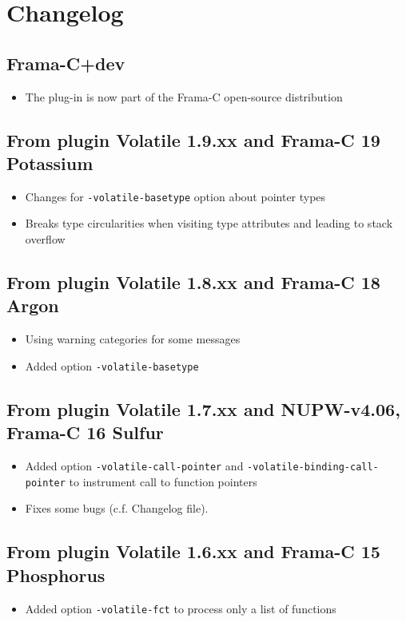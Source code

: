 \chapter*{Changelog}

\section*{Frama-C+dev}
\begin{itemize}
\item The plug-in is now part of the Frama-C open-source distribution
\end{itemize}

\section*{From plugin Volatile 1.9.xx and Frama-C 19 Potassium}
\begin{itemize}
\item Changes for \texttt{-volatile-basetype} option about pointer types
\item Breaks type circularities when visiting type attributes and leading to stack overflow
\end{itemize}

\section*{From plugin Volatile 1.8.xx and Frama-C 18 Argon }
\begin{itemize}
\item Using warning categories for some messages
\item Added option \texttt{-volatile-basetype}
\end{itemize}

\section*{From plugin Volatile 1.7.xx and NUPW-v4.06, Frama-C 16 Sulfur }
\begin{itemize}
\item Added option \texttt{-volatile-call-pointer} and \texttt{-volatile-binding-call-pointer} to instrument call to function pointers
\item Fixes some bugs (c.f. Changelog file).
\end{itemize}

\section*{From plugin Volatile 1.6.xx and Frama-C 15 Phosphorus }
\begin{itemize}
\item Added option \texttt{-volatile-fct} to process only a list of functions
\end{itemize}

